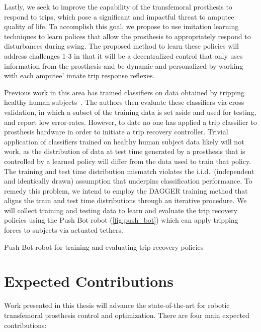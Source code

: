 Lastly, we seek to improve the capability of the transfemoral prosthesis to
respond to trips, which pose a significant and impactful threat to amputee
quality of life. To accomplish this goal, we propose to use imitation learning
techniques \citep{argall2009survey} to learn polices that allow the prosthesis
to appropriately respond to disturbances during swing.  The proposed method to
learn these policies will address challenges 1-3 in that it will be a
decentralized control that only uses information from the prosthesis and be
dynamic and personalized by working with each amputee' innate trip response
reflexes.

Previous work in this area has trained classifiers on data obtained by tripping
healthy human subjects~\citep{lawson2010stumble, shirota2014recovery}. The
authors then evaluate these classifiers via cross validation, in which a subset
of the training data is set aside and used for testing, and report low
error-rates.  However, to date no one has applied a trip classifier to
prosthesis hardware in order to initiate a trip recovery controller. Trivial
application of classifiers trained on healthy human subject data likely will not
work, as the distribution of data at test time generated by a prosthesis that is
controlled by a learned policy will differ from the data used to train that
policy. The training and test time distribution mismatch violates the i.i.d.\
(independent and identically drawn) assumption that underpins classification
performance. To remedy this problem, we intend to employ the DAGGER training
method \citep{ross2011reduction} that aligns the train and test time
distributions through an iterative procedure. We will collect training and
testing data to learn and evaluate the trip recovery policies using the Push Bot
robot (\cref{fig:push_bot}) which can apply tripping forces to subjects via
actuated tethers.

\begin{marginfigure}[-3in]
    \centering
    \caption{Push Bot robot for training and evaluating trip recovery policies}
    \label{fig:push_bot}
\end{marginfigure}

\section{Expected Contributions}\label{sec:intro_contributions}

Work presented in this thesis will advance the state-of-the-art for robotic
transfemoral prosthesis control and optimization. There are four main expected 
contributions: 

